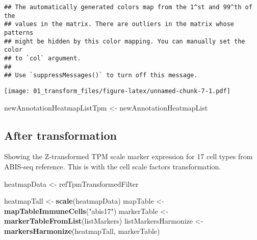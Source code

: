 \documentclass[
]{article}
\newenvironment{Shaded}{\begin{snugshade}}{\end{snugshade}}
\newcommand{\FunctionTok}[1]{\textcolor[rgb]{0.13,0.29,0.53}{\textbf{#1}}}
\newcommand{\NormalTok}[1]{#1}
\newcommand{\OtherTok}[1]{\textcolor[rgb]{0.56,0.35,0.01}{#1}}
\newcommand{\SpecialCharTok}[1]{\textcolor[rgb]{0.81,0.36,0.00}{\textbf{#1}}}
\newcommand{\StringTok}[1]{\textcolor[rgb]{0.31,0.60,0.02}{#1}}
\begin{document}
\begin{verbatim}
## The automatically generated colors map from the 1^st and 99^th of the
## values in the matrix. There are outliers in the matrix whose patterns
## might be hidden by this color mapping. You can manually set the color
## to `col` argument.
## 
## Use `suppressMessages()` to turn off this message.
\end{verbatim}

\begin{Shaded}
\end{Shaded}

\texttt{[image: 01\_transform\_files/figure-latex/unnamed-chunk-7-1.pdf]}

\begin{Shaded}
\begin{Highlighting}[]
\NormalTok{newAnnotationHeatmapListTpm }\OtherTok{\textless{}{-}}\NormalTok{ newAnnotationHeatmapList}
\end{Highlighting}
\end{Shaded}

\hypertarget{after-transformation}{%
\subsection{After transformation}\label{after-transformation}}

Showing the Z-transformed TPM scale marker expression for 17 cell types
from ABIS-seq reference. This is with the cell scale factors
transformation.

\begin{Shaded}
\begin{Highlighting}[]
\NormalTok{heatmapData }\OtherTok{\textless{}{-}}\NormalTok{ refTpmTransformedFilter}
\end{Highlighting}
\end{Shaded}

\begin{Shaded}
\begin{Highlighting}[]
\NormalTok{heatmapTall }\OtherTok{\textless{}{-}} \FunctionTok{scale}\NormalTok{(heatmapData)}
\NormalTok{mapTable }\OtherTok{\textless{}{-}} \FunctionTok{mapTableImmuneCells}\NormalTok{(}\StringTok{"abis17"}\NormalTok{)}
\NormalTok{markerTable }\OtherTok{\textless{}{-}} \FunctionTok{markerTableFromList}\NormalTok{(listMarkers)}
\NormalTok{listMarkersHarmonize }\OtherTok{\textless{}{-}} \FunctionTok{markersHarmonize}\NormalTok{(heatmapTall, markerTable)}
\end{Highlighting}
\end{Shaded}
\end{document}
